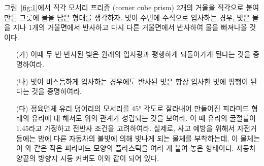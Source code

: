 \documentclass[tightenlines,floatfix,nofootinbib,superscriptaddress,fleqn]{revtex4-2}
\begin{document}
그림~\ref{fig:1}에서 직각 모서리 프리즘 (corner cube prism) 2개의 거울을
직각으로 붙여 만든 그릇에 물을 담은 형태를 생각하자. 빛이 수면에
수직으로 입사하는 경우, 빛은 물을 지나 1개의 거울면에서 반사하고 다시
다른 거울면에서 반사하여 물을 빠져나올 것이다.
\begin{itemize}
\item[(가)] 이때 두 번 반사된 빛은 원래의 입사광과 평행하게 되돌아가게
  된다는 것을 증명하여라.
\item[(나)] 빛이 비스듬하게 입사하는 경우에도 반사된 빛은 항상 입사한
  빛에 평행이 된다는 것을 증명하여라.
\item[(다)] 정육면체 유리 덩어리의 모서리를 45° 각도로 잘라내어
  만들어진 피라미드 형태의 유리에 대 해서도 위의 관계가 성립되는 것을
  보여라. 이 때 유리의 굴절률이 1.45라고 가정하고 전반사 조건을
  고려하여라. 실제로, 사고 예방을 위해서 자전거 등에는 밤에 다른
  자동차의 불빛에 의해 빛나게 되는 물체를 부착하는데, 이 물체는 이 와
  같은 작은 피라미드 모양의 플라스틱을 여러 개 붙여 놓은
  형태이다. 자동차 양끝의 방향지 시등 커버도 이와 같이 되어 있다.  
\end{itemize}
\end{document}
